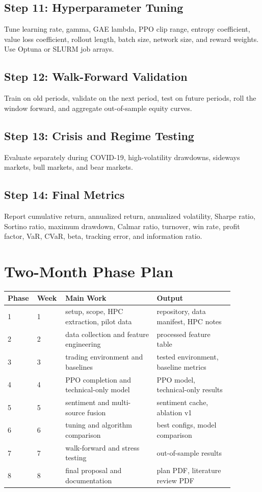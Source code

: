 \documentclass[11pt]{article}
\begin{document}
\subsection{Step 11: Hyperparameter Tuning}
Tune learning rate, gamma, GAE lambda, PPO clip range, entropy coefficient, value loss coefficient, rollout length, batch size, network size, and reward weights. Use Optuna or SLURM job arrays.

\subsection{Step 12: Walk-Forward Validation}
Train on old periods, validate on the next period, test on future periods, roll the window forward, and aggregate out-of-sample equity curves.

\subsection{Step 13: Crisis and Regime Testing}
Evaluate separately during COVID-19, high-volatility drawdowns, sideways markets, bull markets, and bear markets.

\subsection{Step 14: Final Metrics}
Report cumulative return, annualized return, annualized volatility, Sharpe ratio, Sortino ratio, maximum drawdown, Calmar ratio, turnover, win rate, profit factor, VaR, CVaR, beta, tracking error, and information ratio.

\section{Two-Month Phase Plan}
\begin{longtable}{p{0.08\linewidth}p{0.10\linewidth}p{0.38\linewidth}p{0.32\linewidth}}
\toprule
Phase & Week & Main Work & Output \\
\midrule
1 & 1 & setup, scope, HPC extraction, pilot data & repository, data manifest, HPC notes \\
2 & 2 & data collection and feature engineering & processed feature table \\
3 & 3 & trading environment and baselines & tested environment, baseline metrics \\
4 & 4 & PPO completion and technical-only model & PPO model, technical-only results \\
5 & 5 & sentiment and multi-source fusion & sentiment cache, ablation v1 \\
6 & 6 & tuning and algorithm comparison & best configs, model comparison \\
7 & 7 & walk-forward and stress testing & out-of-sample results \\
8 & 8 & final proposal and documentation & plan PDF, literature review PDF \\
\bottomrule
\end{longtable}
\end{document}
